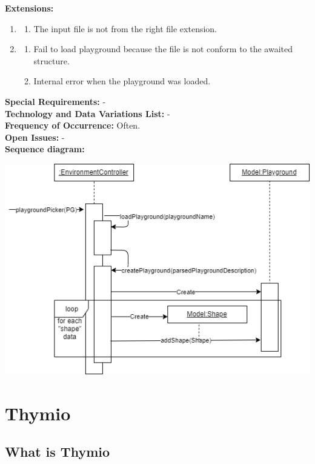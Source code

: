 \documentclass{scrreprt}
\begin{document}
\textbf{Extensions: }
\begin{enumerate}\addtocounter{enumi}{1}
  \item 
  \begin{enumerate}
    \item The input file is not from the right file extension. 
  \end{enumerate}
  \item 
  \begin{enumerate}
    \item Fail to load playground because the file is not conform to the awaited structure.
    \item Internal error when the playground was loaded.
  \end{enumerate}
\end{enumerate}
\textbf{Special Requirements: }- \\
\textbf{Technology and Data Variations List: }- \\
\textbf{Frequency of Occurrence: }Often. \\
\textbf{Open Issues: }- \\
\textbf{Sequence diagram: } \\
\begin{center}
  \includegraphics[scale=0.7]{./loadPlayground_sd}
\end{center}

\chapter{Thymio}
\section{What is Thymio} 
\end{document}
